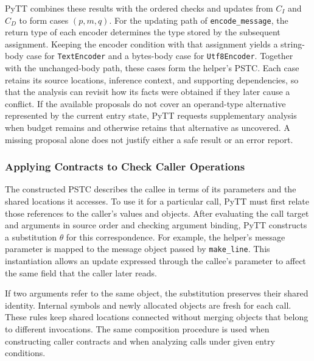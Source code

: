 PyTT combines these results with the ordered checks and updates from
$C_I$ and $C_D$ to form cases $(p,m,q)$. For the updating path of
\texttt{encode\_message}, the return type of each encoder determines the
type stored by the subsequent assignment. Keeping the encoder condition
with that assignment yields a string-body case for \texttt{TextEncoder}
and a bytes-body case for \texttt{Utf8Encoder}. Together with the
unchanged-body path, these cases form the helper's PSTC. Each case
retains its source locations, inference context, and supporting
dependencies, so that the analysis can revisit how its facts were
obtained if they later cause a conflict. If the available proposals do
not cover an operand-type alternative represented by the current entry
state, PyTT requests supplementary analysis when budget remains and
otherwise retains that alternative as uncovered. A missing proposal alone
does not justify either a safe result or an error report.

\subsubsection{Applying Contracts to Check Caller Operations}
\label{sec:composition}

The constructed PSTC describes the callee in terms of its parameters and
the shared locations it accesses. To use it for a particular call, PyTT
must first relate those references to the caller's values and objects.
After evaluating the call target and arguments in source order and
checking argument binding, PyTT constructs a substitution $\theta$ for
this correspondence. For example, the helper's message parameter is
mapped to the message object passed by \texttt{make\_line}.
This instantiation allows an update expressed through the callee's
parameter to affect the same field that the caller later reads.

If two arguments refer to the same object, the substitution preserves
their shared identity. Internal symbols and newly allocated objects are
fresh for each call. These rules keep shared locations connected without
merging objects that belong to different invocations. The same
composition procedure is used when constructing caller contracts and
when analyzing calls under given entry conditions.

